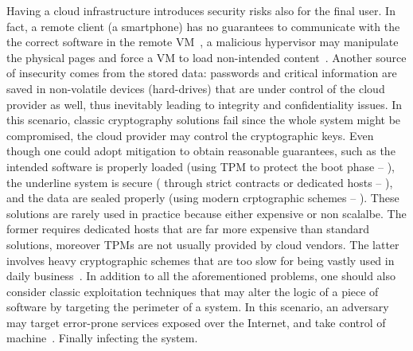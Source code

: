 Having a cloud infrastructure introduces security risks also for the final 
user. In fact, a remote client (\eg a smartphone) has no guarantees to 
communicate with the the correct software in the remote 
VM~\citep{beekman2016attestation}, \eg a malicious hypervisor may manipulate 
the physical pages and force a VM to load non-intended 
content~\citep{10.1145/3292006.3300022}.
Another source of insecurity comes from the stored data: passwords and critical 
information are saved in non-volatile devices (\ie hard-drives) that are under 
control of the cloud provider as well, thus inevitably leading to integrity and 
confidentiality issues.
In this scenario, classic cryptography solutions fail since the whole system 
might be compromised, \ie the cloud provider may control the cryptographic keys.
Even though one could adopt mitigation to obtain reasonable guarantees, such 
as the intended software is properly loaded (\ie using TPM to protect 
the boot phase -- \cite{tpm-isoosi}), the underline system is secure (\ie 
through strict contracts or dedicated hosts -- \cite{aws_dedicated_host}), and
the data are sealed properly (\ie using modern crptographic 
schemes -- \cite{gentry2009fully}).
These solutions are rarely used in practice because either expensive or non 
scalalbe. The former requires dedicated hosts that are far more expensive than 
standard solutions, moreover TPMs are not usually provided by cloud vendors. 
The latter involves heavy cryptographic schemes that are too slow for 
being vastly used in daily business~\citep{10.1145/2046660.2046682}.
%
In addition to all the aforementioned problems, one should also consider 
classic exploitation techniques that may alter the logic of a piece of software 
by targeting the perimeter of a system.
In this scenario, an adversary may target error-prone services exposed over the 
Internet, and take control of 
machine~\citep{van2012memory,10.1145/2810103.2813646}.
Finally infecting the system.

